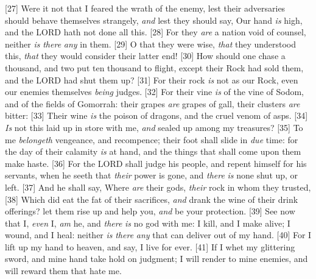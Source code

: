 [27] \textcolor[cmyk]{0.99998,1,0,0}{Were it not that I feared the wrath of the enemy, lest their adversaries should behave themselves strangely, \emph{and} lest they should say, Our hand \emph{is} high, and the LORD hath not done all this.}
[28] \textcolor[cmyk]{0.99998,1,0,0}{For they \emph{are} a nation void of counsel, neither \emph{is} \emph{there} \emph{any}  in them.}
[29] \textcolor[cmyk]{0.99998,1,0,0}{O that they were wise, \emph{that} they understood this, \emph{that} they would consider their latter end!}
[30] \textcolor[cmyk]{0.99998,1,0,0}{How should one chase a thousand, and two put ten thousand to flight, except their Rock had sold them, and the LORD had shut them up?}
[31] \textcolor[cmyk]{0.99998,1,0,0}{For their rock \emph{is} not as our Rock, even our enemies themselves \emph{being} judges.}
[32] \textcolor[cmyk]{0.99998,1,0,0}{For their vine \emph{is} of the vine of Sodom, and of the fields of Gomorrah: their grapes \emph{are} grapes of gall, their clusters \emph{are} bitter:}
[33] \textcolor[cmyk]{0.99998,1,0,0}{Their wine \emph{is} the poison of dragons, and the cruel venom of asps.}
[34] \textcolor[cmyk]{0.99998,1,0,0}{\emph{Is} not this laid up in store with me, \emph{and} sealed up among my treasures?}
[35] \textcolor[cmyk]{0.99998,1,0,0}{To me \emph{belongeth} vengeance, and recompence; their foot shall slide in \emph{due} time: for the day of their calamity \emph{is} at hand, and the things that shall come upon them make haste.}
[36] \textcolor[cmyk]{0.99998,1,0,0}{For the LORD shall judge his people, and repent himself for his servants, when he seeth that \emph{their} power is gone, and \emph{there} \emph{is} none shut up, or left.}
[37] \textcolor[cmyk]{0.99998,1,0,0}{And he shall say, Where \emph{are} their gods, \emph{their} rock in whom they trusted,}
[38] \textcolor[cmyk]{0.99998,1,0,0}{Which did eat the fat of their sacrifices, \emph{and} drank the wine of their drink offerings? let them rise up and help you, \emph{and} be your protection.}
[39] \textcolor[cmyk]{0.99998,1,0,0}{See now that I, \emph{even} I, \emph{am} he, and \emph{there} \emph{is} no god with me: I kill, and I make alive; I wound, and I heal: neither \emph{is} \emph{there} \emph{any} that can deliver out of my hand.}
[40] \textcolor[cmyk]{0.99998,1,0,0}{For I lift up my hand to heaven, and say, I live for ever.}
[41] \textcolor[cmyk]{0.99998,1,0,0}{If I whet my glittering sword, and mine hand take hold on judgment; I will render  to mine enemies, and will reward them that hate me.}
